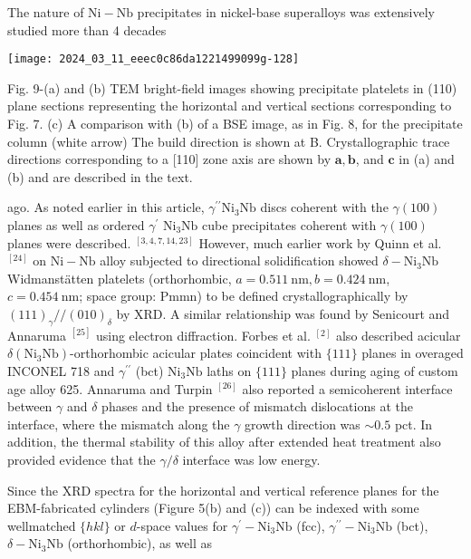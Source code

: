 \documentclass[10pt]{article}
\begin{document}
The nature of $\mathrm{Ni}-\mathrm{Nb}$ precipitates in nickel-base superalloys was extensively studied more than 4 decades

\begin{center}
\texttt{[image: 2024\_03\_11\_eeec0c86da1221499099g-128]}
\end{center}

Fig. 9-(a) and (b) TEM bright-field images showing precipitate platelets in (110) plane sections representing the horizontal and vertical sections corresponding to Fig. 7. (c) A comparison with (b) of a BSE image, as in Fig. 8, for the precipitate column (white arrow) The build direction is shown at B. Crystallographic trace directions corresponding to a [110] zone axis are shown by $\mathbf{a}, \mathbf{b}$, and $\mathbf{c}$ in (a) and (b) and are described in the text.

ago. As noted earlier in this article, $\gamma^{\prime \prime} \mathrm{Ni}_{3} \mathrm{Nb}$ discs coherent with the $\gamma(100)$ planes as well as ordered $\gamma^{\prime}$ $\mathrm{Ni}_{3} \mathrm{Nb}$ cube precipitates coherent with $\gamma(100)$ planes were described. ${ }^{[3,4,7,14,23]}$ However, much earlier work by Quinn et al. ${ }^{[24]}$ on $\mathrm{Ni}-\mathrm{Nb}$ alloy subjected to directional solidification showed $\delta-\mathrm{Ni}_{3} \mathrm{Nb}$ Widmanstätten platelets (orthorhombic, $a=0.511 \mathrm{~nm}, b=0.424 \mathrm{~nm}$, $c=0.454 \mathrm{~nm}$; space group: Pmmn) to be defined crystallographically by $(111)_{\gamma} / /(010)_{\delta}$ by XRD. A similar relationship was found by Senicourt and Annaruma ${ }^{[25]}$ using electron diffraction. Forbes et al. ${ }^{[2]}$ also described acicular $\delta\left(\mathrm{Ni}_{3} \mathrm{Nb}\right)$-orthorhombic acicular plates coincident with $\{111\}$ planes in overaged INCONEL 718 and $\gamma^{\prime \prime}$ (bct) $\mathrm{Ni}_{3} \mathrm{Nb}$ laths on $\{111\}$ planes during aging of custom age alloy 625. Annaruma and Turpin ${ }^{[26]}$ also reported a semicoherent interface between $\gamma$ and $\delta$ phases and the presence of mismatch dislocations at the interface, where the mismatch along the $\gamma$ growth direction was $\sim 0.5$ pct. In addition, the thermal stability of this alloy after extended heat treatment also provided evidence that the $\gamma / \delta$ interface was low energy.

Since the XRD spectra for the horizontal and vertical reference planes for the EBM-fabricated cylinders (Figure 5(b) and (c)) can be indexed with some wellmatched $\{h k l\}$ or $d$-space values for $\gamma^{\prime}-\mathrm{Ni}_{3} \mathrm{Nb}$ (fcc), $\gamma^{\prime \prime}-\mathrm{Ni}_{3} \mathrm{Nb}$ (bct), $\delta-\mathrm{Ni}_{3} \mathrm{Nb}$ (orthorhombic), as well as
\end{document}
